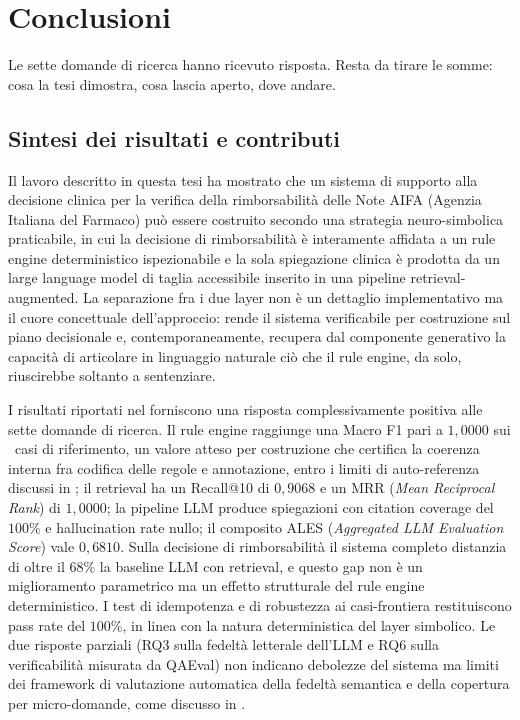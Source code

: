 \chapter{Conclusioni}
\label{ch:conclusioni}

Le sette domande di ricerca hanno ricevuto risposta. Resta da tirare le
somme: cosa la tesi dimostra, cosa lascia aperto, dove andare.

\section{Sintesi dei risultati e contributi}
\label{sec:concl-sintesi}

Il lavoro descritto in questa tesi ha mostrato che un sistema di supporto alla decisione clinica per la verifica della rimborsabilità delle Note AIFA (Agenzia Italiana del Farmaco) può essere costruito secondo una strategia neuro-simbolica praticabile, in cui la decisione di rimborsabilità è interamente affidata a un rule engine deterministico ispezionabile e la sola spiegazione clinica è prodotta da un large language model di taglia accessibile inserito in una pipeline retrieval-augmented. La separazione fra i due layer non è un dettaglio implementativo ma il cuore concettuale dell'approccio: rende il sistema verificabile per costruzione sul piano decisionale e, contemporaneamente, recupera dal componente generativo la capacità di articolare in linguaggio naturale ciò che il rule engine, da solo, riuscirebbe soltanto a sentenziare.

I risultati riportati nel  forniscono una risposta complessivamente positiva alle sette domande di ricerca. Il rule engine raggiunge una Macro F1 pari a $1{,}0000$ sui \goldn\ casi di riferimento, un valore atteso per costruzione che certifica la coerenza interna fra codifica delle regole e annotazione, entro i limiti di auto-referenza discussi in ; il retrieval ha un Recall@10 di $0{,}9068$ e un MRR (\emph{Mean Reciprocal Rank}) di $1{,}0000$; la pipeline LLM produce spiegazioni con citation coverage del $100\%$ e hallucination rate nullo; il composito ALES (\emph{Aggregated LLM Evaluation Score}) vale $0{,}6810$. Sulla decisione di rimborsabilità il sistema completo distanzia di oltre il $68\%$ la baseline LLM con retrieval, e questo gap non è un miglioramento parametrico ma un effetto strutturale del rule engine deterministico. I test di idempotenza e di robustezza ai casi-frontiera restituiscono pass rate del $100\%$, in linea con la natura deterministica del layer simbolico. Le due risposte parziali (RQ3 sulla fedeltà letterale dell'LLM e RQ6 sulla verificabilità misurata da QAEval) non indicano debolezze del sistema ma limiti dei framework di valutazione automatica della fedeltà semantica e della copertura per micro-domande, come discusso in .

